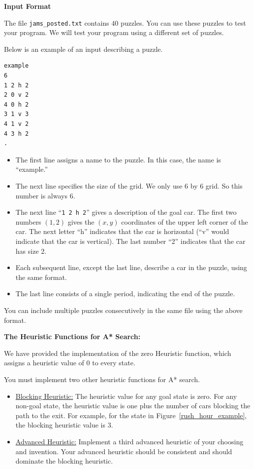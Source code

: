 \documentclass[12pt]{article}
\begin{document}
{\bf Input Format}

The file \verb+jams_posted.txt+ contains $40$ puzzles. You can use these puzzles to test your program. We will test your program using a different set of puzzles.

Below is an example of an input describing a puzzle.

\begin{verbatim}
example
6
1 2 h 2
2 0 v 2
4 0 h 2
3 1 v 3
4 1 v 2
4 3 h 2
.  
\end{verbatim}

\begin{itemize}
\item The first line assigns a name to the puzzle. In this case, the name is ``example.''
\item The next line specifies the size of the grid. We only use 6 by 6 grid. So this number is always 6.
\item The next line ``\verb+1 2 h 2+'' gives a description of the goal car.  The first two numbers $(1,2)$ gives the $(x,y)$ coordinates of the upper left corner of the car. The next letter ``h'' indicates that the car is horizontal (``v'' would indicate that the car is vertical). The last number ``2'' indicates that the car has size 2.
\item Each subsequent line, except the last line, describe a car in the puzzle, using the same format.
\item The last line consists of a single period, indicating the end of the puzzle. 
\end{itemize}

You can include multiple puzzles consecutively in the same file using the above format. 

{\bf The Heuristic Functions for A* Search:}

We have provided the implementation of the zero Heuristic function, which assigns a heuristic value of 0 to every state.

You must implement two other heuristic functions for A* search.
\begin{itemize}

  \item \underline{Blocking Heuristic:} The heuristic value for any goal state is zero. For any non-goal state, the heuristic value is one plus the number of cars blocking the path to the exit. For example, for the state in Figure~\ref{rush_hour_example}, the blocking heuristic value is $3$.
  
  \item \underline{Advanced Heuristic:} Implement a third advanced heuristic of your choosing and invention. Your advanced heuristic should be consistent and should dominate the blocking heuristic.
  
\end{itemize}
\end{document}
